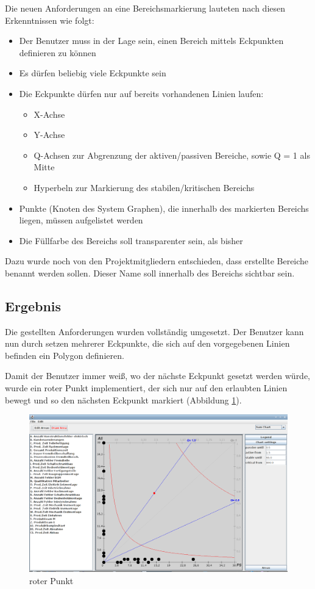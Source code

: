 Die neuen Anforderungen an eine Bereichsmarkierung lauteten nach diesen Erkenntnissen wie folgt:
\begin{itemize}
  \item Der Benutzer muss in der Lage sein, einen Bereich mittels Eckpunkten definieren zu können
  \item Es dürfen beliebig viele Eckpunkte sein
  \item Die Eckpunkte dürfen nur auf bereits vorhandenen Linien laufen:
  \begin{itemize}
    \item X-Achse
    \item Y-Achse
    \item Q-Achsen zur Abgrenzung der aktiven/passiven Bereiche, sowie Q = 1 als Mitte
    \item Hyperbeln zur Markierung des stabilen/kritischen Bereichs
  \end{itemize}
  \item Punkte (Knoten des System Graphen), die innerhalb des markierten Bereichs liegen, müssen aufgelistet werden
  \item Die Füllfarbe des Bereichs soll transparenter sein, als bisher
\end{itemize}

Dazu wurde noch von den Projektmitgliedern entschieden, dass erstellte Bereiche benannt werden sollen. Dieser Name soll innerhalb des Bereichs sichtbar sein.

\subsection{Ergebnis}

Die gestellten Anforderungen wurden vollständig umgesetzt. Der Benutzer kann nun durch setzen mehrerer Eckpunkte, die sich auf den vorgegebenen Linien befinden ein Polygon definieren.

Damit der Benutzer immer weiß, wo der nächste Eckpunkt gesetzt werden würde, wurde ein roter Punkt implementiert, der sich nur auf den erlaubten Linien bewegt und so den nächsten Eckpunkt markiert (Abbildung \ref{roterPunkt}).
\begin{figure}
	\centering
	\includegraphics[width=1\textwidth]{pictures/roter-punkt.png}
	\caption{roter Punkt}
	\label{roterPunkt}
\end{figure}

